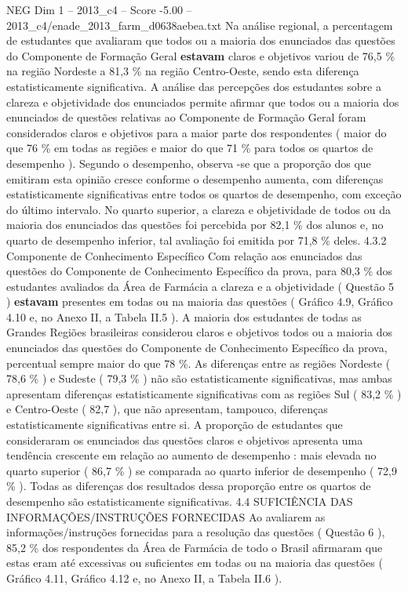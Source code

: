 \begin{textsample}{NEG Dim 1 – 2013\_c4 – Score -5.00 – 2013\_c4/enade\_2013\_farm\_d0638aebea.txt}
Na análise regional, a percentagem de estudantes que avaliaram que todos ou a maioria dos enunciados das questões do Componente de Formação Geral \textbf{estavam} claros e objetivos variou de 76,5 \% na região Nordeste a 81,3 \% na região Centro-Oeste, sendo esta diferença estatisticamente significativa.
A análise das percepções dos estudantes sobre a clareza e objetividade dos enunciados permite afirmar que todos ou a maioria dos enunciados de questões relativas ao Componente de Formação Geral foram considerados claros e objetivos para a maior parte dos respondentes ( maior do que 76 \% em todas as regiões e maior do que 71 \% para todos os quartos de desempenho ).
Segundo o desempenho, observa -se que a proporção dos que emitiram esta opinião cresce conforme o desempenho aumenta, com diferenças estatisticamente significativas entre todos os quartos de desempenho, com exceção do último intervalo.
No quarto superior, a clareza e objetividade de todos ou da maioria dos enunciados das questões foi percebida por 82,1 \% dos alunos e, no quarto de desempenho inferior, tal avaliação foi emitida por 71,8 \% deles. 4.3.2 Componente de Conhecimento Específico Com relação aos enunciados das questões do Componente de Conhecimento Específico da prova, para 80,3 \% dos estudantes avaliados da Área de Farmácia a clareza e a objetividade ( Questão 5 ) \textbf{estavam} presentes em todas ou na maioria das questões ( Gráfico 4.9, Gráfico 4.10 e, no Anexo II, a Tabela II.5 ).
A maioria dos estudantes de todas as Grandes Regiões brasileiras considerou claros e objetivos todos ou a maioria dos enunciados das questões do Componente de Conhecimento Específico da prova, percentual sempre maior do que 78 \%.
As diferenças entre as regiões Nordeste ( 78,6 \% ) e Sudeste ( 79,3 \% ) não são estatisticamente significativas, mas ambas apresentam diferenças estatisticamente significativas com as regiões Sul ( 83,2 \% ) e Centro-Oeste ( 82,7 ), que não apresentam, tampouco, diferenças estatisticamente significativas entre si.
A proporção de estudantes que consideraram os enunciados das questões claros e objetivos apresenta uma tendência crescente em relação ao aumento de desempenho : mais elevada no quarto superior ( 86,7 \% ) se comparada ao quarto inferior de desempenho ( 72,9 \% ).
Todas as diferenças dos resultados dessa proporção entre os quartos de desempenho são estatisticamente significativas. 4.4 SUFICIÊNCIA DAS INFORMAÇÕES/INSTRUÇÕES FORNECIDAS Ao avaliarem as informações/instruções fornecidas para a resolução das questões ( Questão 6 ), 85,2 \% dos respondentes da Área de Farmácia de todo o Brasil afirmaram que estas eram até excessivas ou suficientes em todas ou na maioria das questões ( Gráfico 4.11, Gráfico 4.12 e, no Anexo II, a Tabela II.6 ).

\end{textsample}
